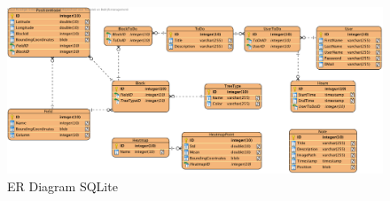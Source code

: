 \documentclass[12pt]{article}
\begin{document}
	\begin{landscape}
		\begin{figure}[htbp]
			\centering
			\includegraphics[width=\paperwidth,keepaspectratio=true]{../img/ERTreeWatch.png}
			\hfill
			\caption{ER Diagram SQLite}
		\end{figure}
	\end{landscape}
\end{document}
